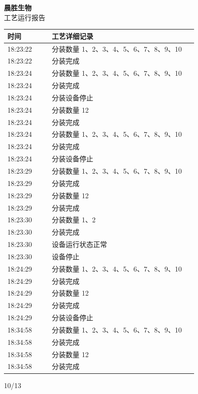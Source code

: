 \documentclass[UTF8,10pt,a4paper,fontset=fandol]{ctexart}
\newcommand{\handwritten}[1]{#1}
\begin{document}
\begin{minipage}[t]{0.47\linewidth}
\centering
\textbf{晨胜生物}\\
工艺运行报告

\smallskip
\begin{tabular}{|p{0.22\linewidth}|p{0.72\linewidth}|}
\hline
时间&工艺详细记录\\
\hline
18:23:22&分装数量 1、2、3、4、5、6、7、8、9、10\\
18:23:22&分装完成\\
18:23:24&分装数量 1、2、3、4、5、6、7、8、9、10\\
18:23:24&分装完成\\
18:23:24&分装设备停止\\
18:23:24&分装数量 12\\
18:23:24&分装完成\\
18:23:24&分装数量 1、2、3、4、5、6、7、8、9、10\\
18:23:24&分装完成\\
18:23:24&分装设备停止\\
18:23:29&分装数量 1、2、3、4、5、6、7、8、9、10\\
18:23:29&分装完成\\
18:23:29&分装数量 12\\
18:23:29&分装完成\\
18:23:30&分装数量 1、2\\
18:23:30&分装完成\\
18:23:30&设备运行状态正常\\
18:23:30&设备停止\\
18:24:29&分装数量 1、2、3、4、5、6、7、8、9、10\\
18:24:29&分装完成\\
18:24:29&分装数量 12\\
18:24:29&分装完成\\
18:24:29&分装设备停止\\
18:34:58&分装数量 1、2、3、4、5、6、7、8、9、10\\
18:34:58&分装完成\\
18:34:58&分装数量 12\\
18:34:58&分装完成\\
\hline
\end{tabular}

\handwritten{10/13}
\end{minipage}

\end{document}
